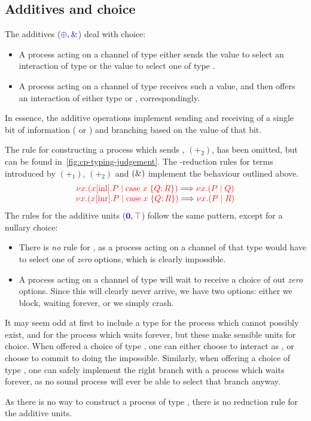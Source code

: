 \subsection{Additives and choice}
\label{sec:cp-additives}
The additives ($\textcolor{blue}{\oplus}, \textcolor{blue}{\mathbin{\text{\&}}}$) deal with choice:
\begin{itemize}
\item
  A process acting on a channel of type  either sends the value
   to select an interaction of type  or the value  to
  select one of type .
\item
  A process acting on a channel of type  receives such a value,
  and then offers an interaction of either type  or ,
  correspondingly.
\end{itemize}
In essence, the additive operations implement sending and receiving of a single
bit of information ( or ) and branching based on the value of
that bit. 
\begin{center}
  \cpInfWith
\end{center}
The rule for constructing a process which sends , $(\plus_2)$, has been
omitted, but can be found in~\cref{fig:cp-typing-judgement}.
The \textbeta-reduction rules for terms introduced by $(\plus_1)$, $(\plus_2)$
and $(\mathbin{\text{\&}})$ implement the behaviour outlined above.
\[
  \begin{array}{c}
    \textcolor{red}{\nu x.(x[\text{inl}].P \mid \text{case}\;x\;\{Q;R\})} \Longrightarrow \textcolor{red}{\nu x.(P \mid Q)}
    \\
    \textcolor{red}{\nu x.(x[\text{inr}].P \mid \text{case}\;x\;\{Q;R\})} \Longrightarrow \textcolor{red}{\nu x.(P \mid R)}
  \end{array}
\]
%
The rules for the additive units ($\textcolor{blue}{\mathbf{0}}, \textcolor{blue}{\top}$) follow the same
pattern, except for a nullary choice:
\begin{itemize}
\item
  There is \emph{no} rule for \ty{\nil}, as a process acting on a channel of
  that type would have to select one of \emph{zero} options, which is clearly
  impossible.
\item
  A process acting on a channel of type \ty{\top} will wait to receive a choice
  of out \emph{zero} options. Since this will clearly never arrive, we have two
  options: either we block, waiting forever, or we simply crash.
\end{itemize}
It may seem odd at first to include a type for the process which cannot possibly
exist, and for the process which waits forever, but these make sensible units
for choice.
When offered a choice of type , one can either choose to
interact as , or choose to commit to doing the impossible.
Similarly, when offering a choice of type , one can safely
implement the right branch with a process which waits forever, as no sound
process will ever be able to select that branch anyway.
\begin{center}
  \cpInfNil
  \cpInfTop
\end{center}
As there is no way to construct a process of type \ty{\nil}, there is no
reduction rule for the additive units.



